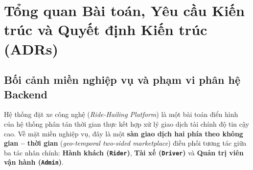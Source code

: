 \documentclass[12pt,a4paper]{article}
\begin{document}
\tableofcontents
\newpage
\listoffigures
\listoftables
\newpage
{}

\section{Tổng quan Bài toán, Yêu cầu Kiến trúc và Quyết định Kiến trúc (ADRs)}

\subsection{Bối cảnh miền nghiệp vụ và phạm vi phân hệ Backend}
Hệ thống đặt xe công nghệ (\textit{Ride-Hailing Platform}) là một bài toán điển hình của hệ thống phân tán thời gian thực kết hợp xử lý giao dịch tài chính độ tin cậy cao. Về mặt miền nghiệp vụ, đây là một \textbf{sàn giao dịch hai phía theo không gian -- thời gian} (\textit{geo-temporal two-sided marketplace}) điều phối tương tác giữa ba tác nhân chính: \textbf{Hành khách (\texttt{Rider})}, \textbf{Tài xế (\texttt{Driver})} và \textbf{Quản trị viên vận hành (\texttt{Admin})}.
\end{document}
